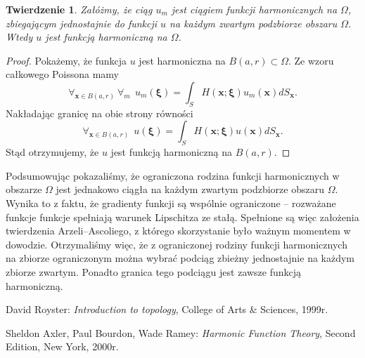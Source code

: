\documentclass[12pt]{article}
\newtheorem{theorem}{Twierdzenie}
\begin{document}
\begin{theorem}
Załóżmy, że ciąg $u_m$ jest ciągiem funkcji harmonicznych na $\Omega$, zbiegającym jednostajnie do funkcji $u$ na każdym zwartym podzbiorze obszaru $\Omega$. Wtedy $u$ jest funkcją harmoniczną na $\Omega$. 
\end{theorem}
\begin{proof}
Pokażemy, że funkcja $u$ jest harmoniczna na $B(a,r) \subset \Omega$. Ze wzoru całkowego Poissona mamy
$$ \forall_{\mathbold{x} \in B(a,r)} \ \forall_m \  \ u_m(\mathbold{\xi})= \int_S H(\mathbold{x};\mathbold{\xi})u_m(\mathbold{x})dS_{\mathbold{x}}.$$
Nakładając granicę na obie strony równości
$$ \forall_{\mathbold{x} \in B(a,r)} \  \ u(\mathbold{\xi})= \int_S H(\mathbold{x};\mathbold{\xi})u(\mathbold{x})dS_{\mathbold{x}}.$$
Stąd otrzymujemy, że $u$ jest funkcją harmoniczną na $B(a,r)$.
\end{proof}

Podsumowując pokazaliśmy, że ograniczona rodzina funkcji harmonicznych w obszarze $\Omega$ jest jednakowo ciągła na każdym zwartym podzbiorze obszaru $\Omega$. Wynika to z faktu, że gradienty funkcji są wspólnie ograniczone -- rozważane funkcje funkcje spełniają warunek Lipschitza ze stałą. Spełnione są więc założenia twierdzenia Arzeli–Ascoliego, z którego skorzystanie było ważnym momentem w dowodzie. Otrzymaliśmy więc, że z ograniczonej rodziny funkcji harmonicznych na zbiorze ograniczonym można wybrać podciąg zbieżny jednostajnie na każdym zbiorze zwartym. Ponadto granica tego podciągu jest zawsze funkcją harmoniczną. 
 


\begin{thebibliography}{99}
 David Royster: 
\emph{Introduction to topology}, College of Arts \& Sciences, 1999r.

 Sheldon Axler, Paul Bourdon, Wade Ramey: 
\emph{Harmonic Function Theory}, Second Edition, New York, 2000r.

\end{thebibliography}
\end{document}
